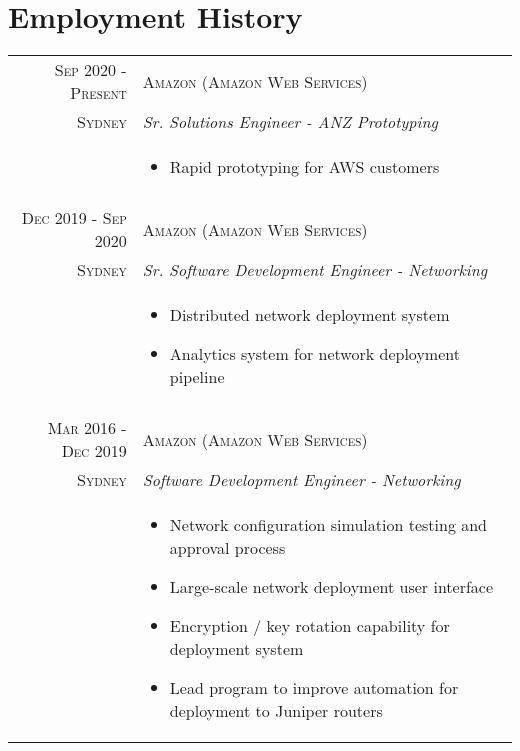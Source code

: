 \section*{Employment History}

\begin{tabular}{r|p{11cm}}

\textsc{Sep 2020 - Present} & \textsc{Amazon (Amazon Web Services)}\\
\textsc{Sydney} & \emph{Sr. Solutions Engineer - ANZ Prototyping}\\
& \begin{footnotesize}
\begin{itemize}
	\vspace*{-\baselineskip}
	\item Rapid prototyping for AWS customers
	\vspace*{-\baselineskip}
\end{itemize}
\end{footnotesize}\\

\multicolumn{2}{c}{} \\

\textsc{Dec 2019 - Sep 2020} & \textsc{Amazon (Amazon Web Services)}\\
\textsc{Sydney} & \emph{Sr. Software Development Engineer - Networking}\\
& \begin{footnotesize}
\begin{itemize}
	\vspace*{-\baselineskip}
	\item Distributed network deployment system
	\item Analytics system for network deployment pipeline
	\vspace*{-\baselineskip}
\end{itemize}
\end{footnotesize}\\

\multicolumn{2}{c}{} \\

\textsc{Mar 2016 - Dec 2019} & \textsc{Amazon (Amazon Web Services)}\\
\textsc{Sydney} & \emph{Software Development Engineer - Networking}\\
& \begin{footnotesize}
\begin{itemize}
	\vspace*{-\baselineskip}
	\item Network configuration simulation testing and approval process
	\item Large-scale network deployment user interface
	\item Encryption / key rotation capability for deployment system
	\item Lead program to improve automation for deployment to Juniper routers
	\vspace*{-\baselineskip}
\end{itemize}
\end{footnotesize}\\


\end{tabular}
